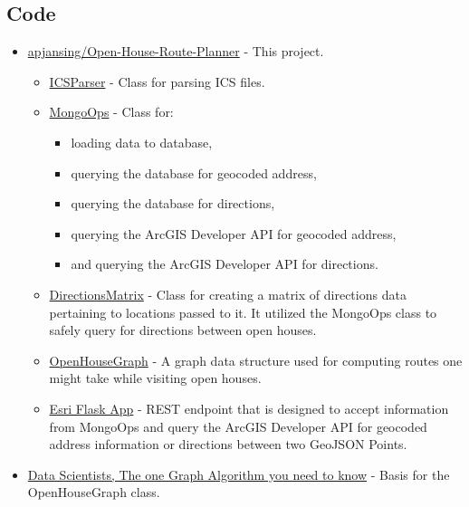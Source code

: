 \documentclass[11 pt]{IEEEtran}
\theoremstyle{definition}
\theoremstyle{definition}
\begin{document}
\subsection{Code}\label{code}
\begin{itemize}
  \item \href{https://github.com/apjansing/Open-House-Route-Planner}{apjansing/Open-House-Route-Planner} - This project.
  \begin{itemize}
    \item \href{https://github.com/apjansing/Open-House-Route-Planner/blob/master/backend/docker/persistence/pyspark/ICSParser.py}{ICSParser} - Class for parsing ICS files.
    \item \href{https://github.com/apjansing/Open-House-Route-Planner/blob/master/backend/docker/persistence/pyspark/MongoOps.py}{MongoOps} - Class for:
    \begin{itemize}
      \item loading data to database, 
      \item querying the database for geocoded address,
      \item querying the database for directions,
      \item querying the ArcGIS Developer API for geocoded address,
      \item and querying the ArcGIS Developer API for directions.
    \end{itemize}
    \item \href{https://github.com/apjansing/Open-House-Route-Planner/blob/master/backend/docker/persistence/pyspark/make_directions_matrix.py}{DirectionsMatrix} - Class for creating a matrix of directions data pertaining to locations passed to it. It utilized the MongoOps class to safely query for directions between open houses.
    \item \href{https://github.com/apjansing/Open-House-Route-Planner/blob/master/backend/docker/persistence/pyspark/OpenHouseGraph.py}{OpenHouseGraph} - A graph data structure used for computing routes one might take while visiting open houses.
    \item \href{https://github.com/apjansing/Open-House-Route-Planner/blob/master/backend/docker/persistence/esri/esri_flask.py}{Esri Flask App} - REST endpoint that is designed to accept information from MongoOps and query the ArcGIS Developer API for geocoded address information or directions between two GeoJSON Points.
  \end{itemize}
  \item \href{https://towardsdatascience.com/to-all-data-scientists-the-one-graph-algorithm-you-need-to-know-59178dbb1ec2}{Data Scientists, The one Graph Algorithm you need to know}\cite{Agarwal} - Basis for the OpenHouseGraph class.
\end{itemize}
\end{document}
